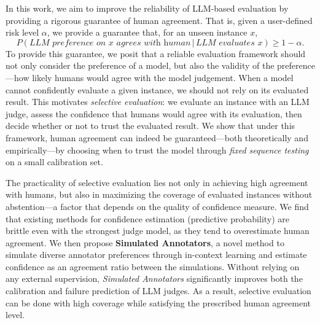 
In this work, we aim to improve the reliability of LLM-based evaluation by providing a rigorous guarantee of human agreement. That is, given a user-defined risk level $\alpha$, we provide a guarantee that, for an unseen instance $x$,
\begin{equation*}
    P(\textit{LLM preference on $x$ agrees with human}\,|\,\textit{LLM evaluates $x$}) \ge 1 - \alpha.
\end{equation*}
To provide this guarantee, we posit that a reliable evaluation framework should not only consider the preference of a model, but also the validity of the preference---\ie how likely humans would agree with the model judgement. When a model cannot confidently evaluate a given instance, we should not rely on its evaluated result. This motivates \emph{selective evaluation}: we evaluate an instance with an LLM judge, assess the confidence that humans would agree with its evaluation, then decide whether or not to trust the evaluated result. We show that under this framework, human agreement can indeed be guaranteed---both theoretically and empirically---by choosing when to trust the model through \textit{fixed sequence testing} \citep{fixed-sequence-testing} on a small calibration set.

The practicality of selective evaluation lies not only in achieving high agreement with humans, but also in maximizing the coverage of evaluated instances without abstention---a factor that depends on the quality of confidence measure. We find that existing methods for confidence estimation (\eg predictive probability) are brittle even with the strongest judge model, as they tend to overestimate human agreement. We then propose \textbf{Simulated Annotators}, a novel method to simulate diverse annotator preferences through in-context learning and estimate confidence as an agreement ratio between the simulations. Without relying on any external supervision, \emph{Simulated Annotators} significantly improves both the calibration and failure prediction of LLM judges. As a result, selective evaluation can be done with high coverage while satisfying the prescribed human agreement level.

